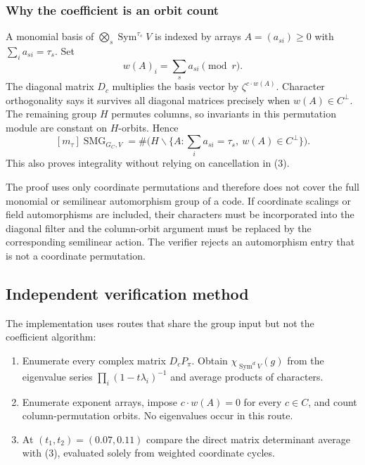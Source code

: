 \documentclass[10pt]{article}
\newcommand{\Sym}{\operatorname{Sym}}
\newcommand{\SMG}{\operatorname{SMG}}
\newcommand{\MGF}{\SMG}
\begin{document}
\subsubsection{Why the coefficient is an orbit count}
A monomial basis of $\bigotimes_s\Sym^{\tau_s}V$ is indexed by arrays $A=(a_{si})\geq0$ with $\sum_i a_{si}=\tau_s$.  Set
\[
 w(A)_i=\sum_s a_{si}\pmod r.
\]
The diagonal matrix $D_c$ multiplies the basis vector by $\zeta^{c\cdot w(A)}$.  Character orthogonality says it survives all diagonal matrices precisely when $w(A)\in C^\perp$.  The remaining group $H$ permutes columns, so invariants in this permutation module are constant on $H$-orbits.  Hence
\begin{equation}
 \boxed{[m_\tau]\MGF_{G_C,V}
 =\#\bigl(H\backslash\{A:\sum_i a_{si}=\tau_s,\ w(A)\in C^\perp\}\bigr).} \tag{4}
\end{equation}
This also proves integrality without relying on cancellation in (3).

The proof uses only coordinate permutations and therefore does not cover the
full monomial or semilinear automorphism group of a code.  If coordinate
scalings or field automorphisms are included, their characters must be
incorporated into the diagonal filter and the column-orbit argument must be
replaced by the corresponding semilinear action.  The verifier rejects an
automorphism entry that is not a coordinate permutation.

\subsection{Independent verification method}
The implementation uses routes that share the group input but not the coefficient algorithm:
\begin{enumerate}[leftmargin=*]
\item Enumerate every complex matrix $D_cP_\pi$.  Obtain $\chi_{\Sym^dV}(g)$ from the eigenvalue series $\prod_i(1-t\lambda_i)^{-1}$ and average products of characters.
\item Enumerate exponent arrays, impose $c\cdot w(A)=0$ for every $c\in C$, and count column-permutation orbits.  No eigenvalues occur in this route.
\item At $(t_1,t_2)=(0.07,0.11)$ compare the direct matrix determinant average with (3), evaluated solely from weighted coordinate cycles.
\end{enumerate}
\end{document}
